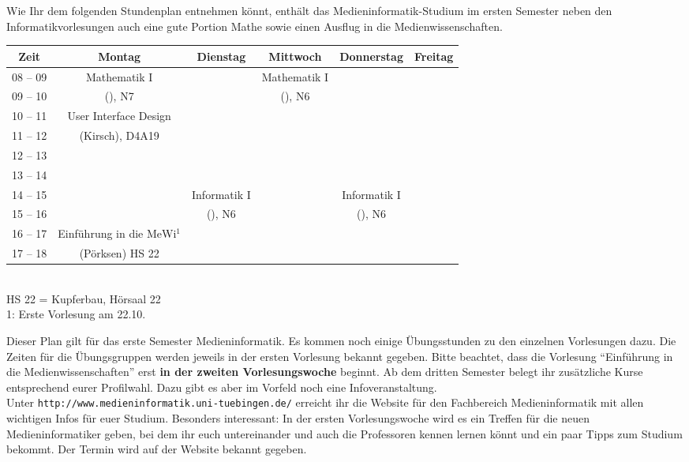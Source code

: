 
Wie Ihr dem folgenden Stundenplan entnehmen könnt, enthält das Medieninformatik-Studium im ersten
Semester neben den Informatikvorlesungen auch eine gute Portion Mathe sowie einen Ausflug in die Medienwissenschaften. 

\begin{center}
	\begin{tabular}{|c|c|c|c|c|c|} \hline
		Zeit      & 			Montag 		& Dienstag			& Mittwoch 			& Donnerstag 			& Freitag	 \\
		\hline\hline
		08 -- 09  & 		Mathematik I 	&  					& Mathematik I 		&  						&			\\
		\cline{1-1}\cline{3-3}\cline{5-6}
		09 -- 10  & 		(\Matheprof), N7& 					& (\Matheprof), N6  &  						&			\\
		\hline
		10 -- 11  &	User Interface Design	&					&					&						&			\\
		\cline{1-1}\cline{3-6}
		11 -- 12 & 	(Kirsch), D4A19			&  					&					&			 			& 			\\
		\hline
		12 -- 13 & 							&  					& 				    & 						& 			 \\
		\hline
		13 -- 14 & 							& 					&   				 & 						& 			 \\
		\hline
		14 -- 15 & 							& Informatik I 		& 					& Informatik I 			& 				\\
		\cline{1-2}\cline{4-4}\cline{6-6}
		15 -- 16 &							& (\Infoprof), N6 	& 					& (\Infoprof), N6 		& 				\\
		\hline
		16 -- 17 & Einführung in die MeWi$^1$ &  	 & 		&						&\\
		\cline{1-1}\cline{3-6}
		17 -- 18 & 	(Pörksen) HS 22 	 	&  &					& 						& \\
		\hline
	\end{tabular}\\
\scriptsize HS 22 = Kupferbau, Hörsaal 22 \\
1: Erste Vorlesung am 22.10.

\end{center}

Dieser Plan gilt für das erste Semester Medieninformatik. 
Es kommen noch einige Übungsstunden
zu den einzelnen Vorlesungen dazu. Die Zeiten für die Übungsgruppen werden jeweils in der ersten Vorlesung bekannt gegeben.
Bitte beachtet, dass die Vorlesung "`Einführung in die Medienwissenschaften"' erst \textbf{in der zweiten Vorlesungswoche} beginnt.
Ab dem dritten Semester belegt ihr zusätzliche Kurse entsprechend eurer Profilwahl. Dazu gibt es aber im Vorfeld noch eine Infoveranstaltung.\\
Unter \texttt{http://www.medieninformatik.uni-tuebingen.de/} erreicht ihr die Website für den Fachbereich Medieninformatik mit allen wichtigen Infos für euer Studium. Besonders interessant: In der ersten Vorlesungswoche wird es ein Treffen für die neuen Medieninformatiker geben, bei dem ihr euch untereinander und auch die Professoren kennen lernen könnt und ein paar Tipps zum Studium bekommt. Der Termin wird auf der Website bekannt gegeben. %
